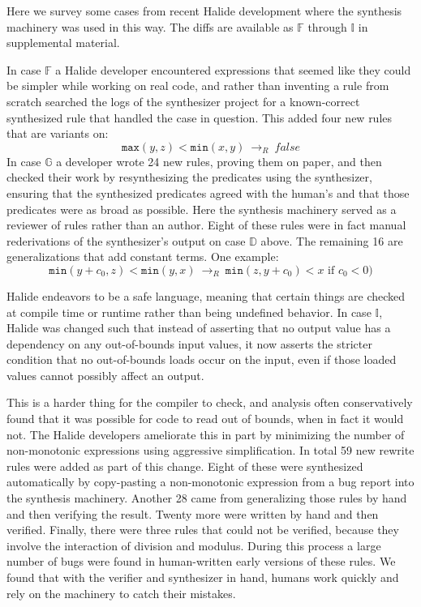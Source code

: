 \documentclass[acmsmall,review,anonymous]{acmart}\settopmatter{printfolios=true,printccs=false,printacmref=false}
\newcommand{\hmax}[0]{\texttt{max}}
\newcommand{\hmin}[0]{\texttt{min}}
\newcommand{\rewrites}[0]{\:\rightarrow_{R}\:}
\newcommand{\pred}[0]{\textrm{ if }}
\begin{document}
Here we survey some cases from recent Halide development where the synthesis machinery was used in this way. The diffs are available as $\mathbb{F}$ through $\mathbb{I}$ in supplemental material. 

In case $\mathbb{F}$ a Halide developer encountered expressions that seemed like they could be simpler while working on real code, and rather than inventing a rule from scratch searched the logs of the synthesizer project for a known-correct synthesized rule that handled the case in question. This added four new rules that are variants on:
\[
\hmax(y, z) < \hmin(x, y) \rewrites false
\]
In case $\mathbb{G}$ a developer wrote 24 new rules, proving them on paper, and then checked their work by resynthesizing the predicates using the synthesizer, ensuring that the synthesized predicates agreed with the human’s and that those predicates were as broad as possible. Here the synthesis machinery served as a reviewer of rules rather than an author. Eight of these rules were in fact manual rederivations of the synthesizer’s output on case $\mathbb{D}$ above. The remaining 16 are generalizations that add constant terms. One example:
\[
\hmin(y + c_0, z) < \hmin(y, x) \rewrites \hmin(z, y + c_0) < x \pred c_0 < 0)
\]

Halide endeavors to be a safe language, meaning that certain things are checked at compile time or runtime rather than being undefined behavior. In case $\mathbb{I}$, Halide was changed such that instead of asserting that no output value has a dependency on any out-of-bounds input values, it now asserts the stricter condition that no out-of-bounds loads occur on the input, even if those loaded values cannot possibly affect an output.

This is a harder thing for the compiler to check, and analysis often conservatively found that it was possible for code to read out of bounds, when in fact it would not. The Halide developers ameliorate this in part by minimizing the number of non-monotonic expressions using aggressive simplification. In total 59 new rewrite rules were added as part of this change. Eight of these were synthesized automatically by copy-pasting a non-monotonic expression from a bug report into the synthesis machinery. Another 28 came from generalizing those rules by hand and then verifying the result. Twenty more were written by hand and then verified. Finally, there were three rules that could not be verified, because they involve the interaction of division and modulus. During this process a large number of bugs were found in human-written early versions of these rules. We found that with the verifier and synthesizer in hand, humans work quickly and rely on the machinery to catch their mistakes.
\end{document}
